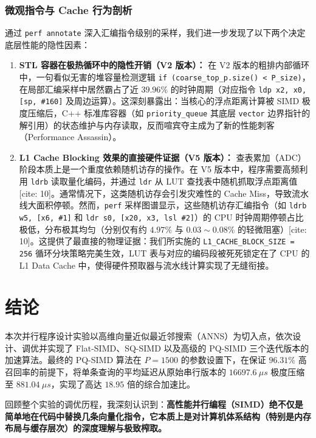 \documentclass[UTF8,a4paper,10pt]{ctexart}
\begin{document}
\subsubsection{微观指令与 Cache 行为剖析}

通过 \texttt{perf annotate} 深入汇编指令级别的采样，我们进一步发现了以下两个决定底层性能的隐性因素：

\begin{enumerate}
    \item \textbf{STL 容器在极热循环中的隐性开销（V2 版本）：} 
    在 V2 版本的粗排内部循环中，一句看似无害的堆容量检测逻辑 \texttt{if (coarse\_top\_p.size() < P\_size)}，在局部汇编采样中居然霸占了近 $39.96\%$ 的时钟周期（对应指令 \texttt{ldp x2, x0, [sp, \#160]} 及周边运算）。这深刻暴露出：当核心的浮点距离计算被 SIMD 极度压缩后，C++ 标准库容器（如 \texttt{priority\_queue} 其底层 \texttt{vector} 边界指针的解引用）的状态维护与内存读取，反而喧宾夺主成为了新的性能刺客（Performance Assassin）。
    
    \item \textbf{L1 Cache Blocking 效果的直接硬件证据（V5 版本）：} 
    查表累加（ADC）阶段本质上是一个重度依赖随机访存的操作。在 V5 版本中，程序需要高频利用 \texttt{ldrb} 读取量化编码，并通过 \texttt{ldr} 从 LUT 查找表中随机抓取浮点距离值[cite: 10]。通常情况下，这类随机访存会引发灾难性的 Cache Miss，导致流水线大面积停顿。然而，\texttt{perf} 采样图谱显示，这些随机访存汇编指令（如 \texttt{ldrb w5, [x6, \#1]} 和 \texttt{ldr s0, [x20, x3, lsl \#2]}）的 CPU 时钟周期停顿占比极低，分布极其均匀（分别仅有约 $4.97\%$ 与 $0.03\sim 0.08\%$ 的轻微阻塞）[cite: 10]。这提供了最直接的物理证据：我们所实施的 \texttt{L1\_CACHE\_BLOCK\_SIZE = 256} 循环分块策略完美生效，LUT 表与对应的编码段被死死锁定在了 CPU 的 L1 Data Cache 中，使得硬件预取器与流水线计算实现了无缝衔接。
\end{enumerate}



\section{结论}

本次并行程序设计实验以高维向量近似最近邻搜索（ANNS）为切入点，依次设计、调优并实现了 Flat-SIMD、SQ-SIMD 以及高级的 PQ-SIMD 三个迭代版本的加速算法。最终的 PQ-SIMD 算法在 $P=1500$ 的参数设置下，在保证 $96.31\%$ 高召回率的前提下，将单条查询的平均延迟从原始串行版本的 $16697.6\ \mu s$ 极度压缩至 $881.04\ \mu s$，实现了高达 $18.95$ 倍的综合加速比。

回顾整个实验的调优历程，我深刻认识到：\textbf{高性能并行编程（SIMD）绝不仅是简单地在代码中替换几条向量化指令，它本质上是对计算机体系结构（特别是内存布局与缓存层次）的深度理解与极致榨取。}
\end{document}
